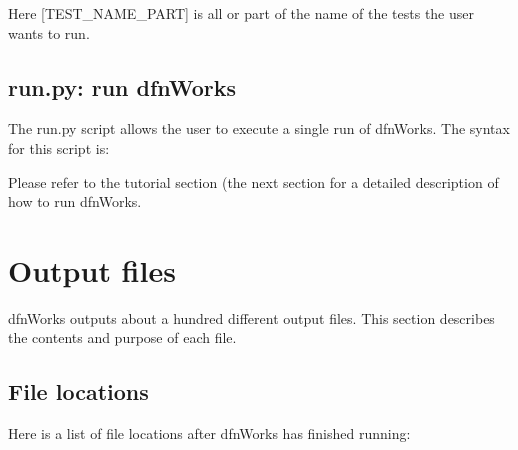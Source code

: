 \documentclass[letterpaper,10pt,english]{sphinxmanual}
\begin{document}

Here {[}TEST\_NAME\_PART{]} is all or part of the name of the tests the user wants to run.


\section{run.py: run dfnWorks}
\label{\detokenize{scripts:run-py-run-dfnworks}}
The run.py script allows the user to execute a single run of dfnWorks. The syntax for this script is:


Please refer to the tutorial section (the next section for a detailed description of how to run dfnWorks.


\chapter{Output files}
\label{\detokenize{output:output-files}}\label{\detokenize{output::doc}}
dfnWorks outputs about a hundred different output files. This section describes the contents and purpose of each file.


\section{File locations}
\label{\detokenize{output:file-locations}}
Here is a list of file locations after dfnWorks has finished running:
\end{document}
